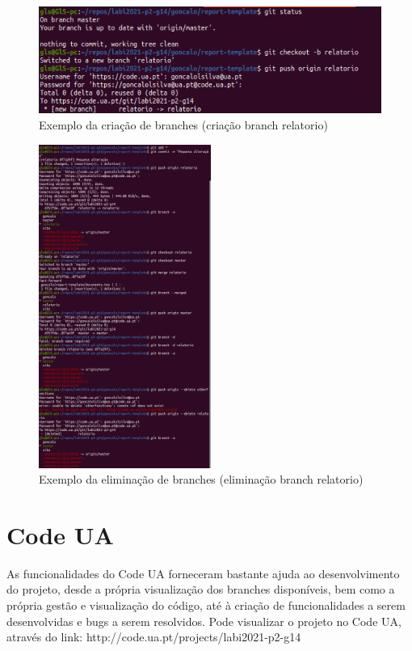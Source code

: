 \documentclass{report}
\begin{document}
\begin{figure}[!h]
\center 
\includegraphics[height=100pt]{img/git_1.png}
\caption{Exemplo da criação de branches (criação branch relatorio)}
\label{fig:git_c}
\end{figure}

\begin{figure}[!h]
\center 
\includegraphics[height=300pt]{img/git_2.png}
\caption{Exemplo da eliminação de branches (eliminação branch relatorio)}
\label{fig:git_d}
\end{figure}

\section{Code UA}
\label{sec:codeua}
As funcionalidades do Code UA forneceram bastante ajuda ao desenvolvimento do projeto, 
desde a própria visualização dos branches disponíveis, bem como a própria gestão e 
visualização do código, até à criação de funcionalidades a serem desenvolvidas e bugs 
a serem resolvidos. Pode visualizar o projeto no Code UA, através do 
link: http://code.ua.pt/projects/labi2021-p2-g14
\cite{codeua}
\end{document}
